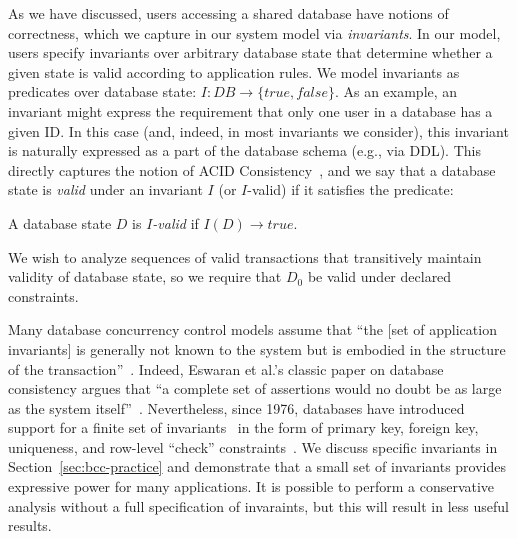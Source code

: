  As we have discussed, users accessing a shared
database have notions of correctness, which we capture in our system
model via \textit{invariants}. In our model, users specify invariants
over arbitrary database state that determine whether a given state is
valid according to application rules. We model invariants as
predicates over database state: $I: DB \rightarrow \{true, false\}$.  As
an example, an invariant might express the requirement that only one
user in a database has a given ID. In this case (and, indeed, in most
invariants we consider), this invariant is naturally expressed as a
part of the database schema (e.g., via DDL). This directly captures
the notion of ACID Consistency~\cite{bernstein-book,gray-virtues}, and
we say that a database state is \textit{valid} under an invariant $I$
(or $I$-valid) if it satisfies the predicate:

\begin{definition}
A database state $D$ is \textit{$I$-valid} if $I(D) \rightarrow true$.
\end{definition}

We wish to analyze sequences of valid transactions that transitively
maintain validity of database state, so we require that $D_0$ be valid
under declared constraints.

 Many database concurrency
control models assume that ``the [set of application invariants] is
generally not known to the system but is embodied in the structure of
the transaction''~\cite{traiger-tods}. Indeed, Eswaran et al.'s
classic paper on database consistency argues that ``a complete set of
assertions would no doubt be as large as the system
itself''~\cite{eswaran-consistency}. Nevertheless, since 1976,
databases have introduced support for a finite set of
invariants~\cite{korth-serializability,decomp-semantics,garciamolina-semantics,ic-survey,ic-survey-two}
in the form of primary key, foreign key, uniqueness, and row-level
``check'' constraints~\cite{kemme-si-ic}. We discuss specific
invariants in Section~\ref{sec:bcc-practice} and demonstrate that a
small set of invariants provides expressive power for many
applications. It is possible to perform a conservative analysis
without a full specification of invaraints, but this will result in
less useful results.\vspace{.5em}



